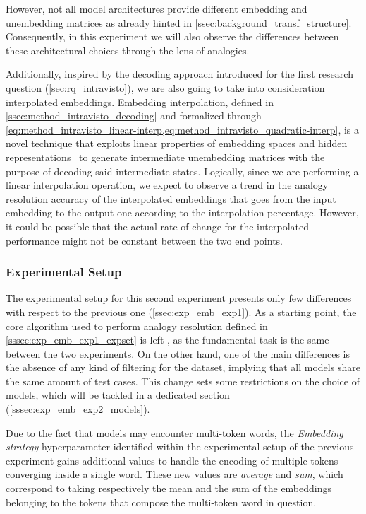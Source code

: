 However, not all model architectures provide different embedding and unembedding matrices as already hinted in \cref{ssec:background_transf_structure}.
Consequently, in this experiment we will also observe the differences between these architectural choices through the lens of analogies.

Additionally, inspired by the decoding approach introduced for the first research question (\cref{sec:rq_intravisto}), we are also going to take into consideration interpolated embeddings.
Embedding interpolation, defined in \cref{ssec:method_intravisto_decoding} and formalized through \cref{eq:method_intravisto_linear-interp,eq:method_intravisto_quadratic-interp}, is a novel technique that exploits linear properties of embedding spaces and hidden representations~\cite{park2023, mikolov2013, drozd2016} to generate intermediate unembedding matrices with the purpose of decoding said intermediate states.
Logically, since we are performing a linear interpolation operation, we expect to observe a trend in the analogy resolution accuracy of the interpolated embeddings that goes from the input embedding to the output one according to the interpolation percentage.
However, it could be possible that the actual rate of change for the interpolated performance might not be constant between the two end points. 

\subsubsection{Experimental Setup}\label{sssec:exp_emb_exp2_expset}

The experimental setup for this second experiment presents only few differences with respect to the previous one (\cref{ssec:exp_emb_exp1}).
As a starting point, the core algorithm used to perform analogy resolution defined in \cref{sssec:exp_emb_exp1_expset} is left , as the fundamental task is the same between the two experiments.
On the other hand, one of the main differences is the absence of any kind of filtering for the dataset, implying that all models share the same amount of test cases.
This change  sets some restrictions on the choice of models, which will be tackled in a dedicated section (\cref{sssec:exp_emb_exp2_models}).

Due to the fact that models may encounter multi-token words, the \textit{Embedding strategy} hyperparameter identified within the experimental setup of the previous experiment gains additional values to handle the encoding of multiple tokens converging inside a single word.
These new values are \textit{average} and \textit{sum}, which correspond to taking respectively the mean and the sum of the embeddings belonging to the tokens that compose the multi-token word in question.  

